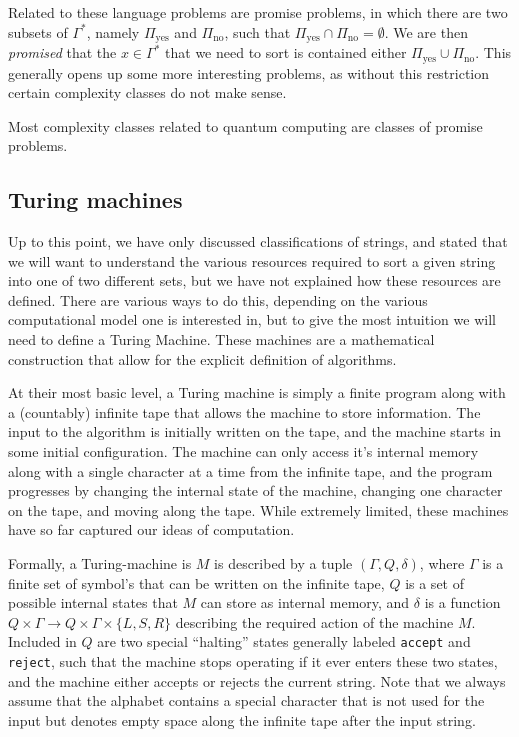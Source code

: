 \documentclass[../thesis-main/thesis-main]{subfiles}
\begin{document}
Related to these language problems are promise problems, in which there are two subsets of $\Gamma^*$, namely $\Pi_{\text{yes}}$ and $\Pi_{\text{no}}$, such that $\Pi_{\text{yes}} \cap \Pi_{\text{no}} = \emptyset$.  We are then \emph{promised} that the $x\in \Gamma^*$ that we need to sort is contained either $\Pi_{\text{yes}} \cup \Pi_{\text{no}}$.  This generally opens up some more interesting problems, as without this restriction certain complexity classes do not make sense.

Most complexity classes related to quantum computing are classes of promise problems.

\subsection{Turing machines}



Up to this point, we have only discussed classifications of strings, and stated that we will want to understand the various resources required to sort a given string into one of two different sets, but we have not explained how these resources are defined.  There are various ways to do this, depending on the various computational model one is interested in, but to give the most intuition we will need to define a Turing Machine.  These machines are a mathematical construction that allow for the explicit definition of algorithms.  

At their most basic level, a Turing machine is simply a finite program along with a (countably) infinite tape that allows the machine to store information.  The input to the algorithm is initially written on the tape, and the machine starts in some initial configuration.  The machine can only access it's internal memory along with a single character at a time from the infinite tape, and the program progresses by changing the internal state of the machine, changing one character on the tape, and moving along the tape.  While extremely limited, these machines have so far captured our ideas of computation.

Formally, a Turing-machine is $M$ is described by a tuple $(\Gamma,Q,\delta)$, where $\Gamma$ is a finite set of symbol's that can be written on the infinite tape, $Q$ is a set of possible internal states that $M$ can store as internal memory, and $\delta$ is a function $Q\times \Gamma \rightarrow Q \times \Gamma\times \{L,S,R\}$ describing the required action of the machine $M$.  Included in $Q$ are two special ``halting'' states generally labeled \texttt{accept} and \texttt{reject}, such that the machine stops operating if it ever enters these two states, and the machine either accepts or rejects the current string.  Note that we always assume that the alphabet contains a special character \textvisiblespace {} that is not used for the input but denotes empty space along the infinite tape after the input string.
\end{document}
